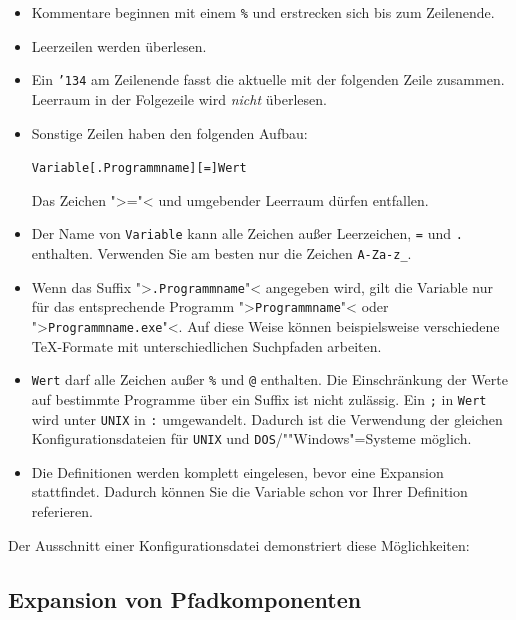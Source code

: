 \documentclass[12pt,ngerman,a4paper,fullparskip]{scrreprt}
\newcommand{\acro}[1]{\texttt{#1}}
\newcommand{\code}[1]{\texttt{#1}}
\newcommand{\var}[1]{\texttt{#1}}
\newcommand{\samp}[1]{\texttt{#1}}
\newcommand{\bs}{\protect\normalfont\ttfamily\char'134}
\begin{document}
\begin{itemize}
\item
  Kommentare beginnen mit einem \code{\%} und erstrecken sich bis zum
  Zeilenende.
\item
  Leerzeilen werden überlesen.
\item
  Ein \samp{\bs} am Zeilenende fasst die aktuelle mit der folgenden Zeile
  zusammen. Leerraum in der Folgezeile wird \emph{nicht} überlesen.
\item
  Sonstige Zeilen haben den folgenden Aufbau:

\begin{alltt}
  \var{Variable}[.\var{Programmname}] [=] \var{Wert}
\end{alltt}%

  Das Zeichen ">="< und umgebender Leerraum dürfen entfallen.
\item
  Der Name von \var{Variable} kann alle Zeichen außer Leerzeichen,
  \samp{=} und \samp{.} enthalten. Verwenden Sie am besten nur die Zeichen
  \samp{A-Za-z\_}.
\item
  Wenn das Suffix ">\code{.\var{Programmname}}"< angegeben wird, gilt die
  Variable nur für das entsprechende Programm ">\var{Programmname}"< oder
  ">\code{\var{Programmname}.exe}"<. Auf diese Weise können
  beispielsweise verschiedene
  \TeX-Formate mit unterschiedlichen Suchpfaden arbeiten.
\item
  \texttt{\var{Wert}} darf alle Zeichen außer \texttt{\%} und \texttt{@}
  enthalten.
  Die Einschränkung der Werte auf bestimmte Programme über ein Suffix
  ist nicht zulässig. Ein \samp{;} in \texttt{\var{Wert}} wird unter
  \acro{UNIX} in \samp{:} umgewandelt. Dadurch ist die Verwendung der gleichen
  Konfigurationsdateien für \acro{UNIX} und \acro{DOS}/""Windows"=Systeme möglich.
\item
  Die Definitionen werden komplett eingelesen, bevor eine Expansion
  stattfindet. Dadurch können Sie die Variable schon vor Ihrer Definition
  referieren.
\end{itemize}

Der Ausschnitt einer Konfigurationsdatei demonstriert diese
Möglichkeiten:




\subsection{Expansion von Pfadkomponenten}
\end{document}
